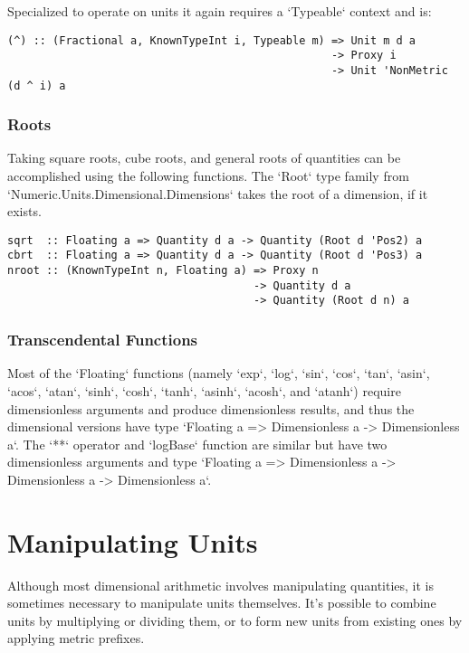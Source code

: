 \documentclass[11pt]{report}
\begin{document}
Specialized to operate on units it again requires a `Typeable` context and is:

\begin{lstlisting}
(^) :: (Fractional a, KnownTypeInt i, Typeable m) => Unit m d a
                                                  -> Proxy i
                                                  -> Unit 'NonMetric (d ^ i) a
\end{lstlisting}

\subsection{Roots}

Taking square roots, cube roots, and general roots of quantities can be accomplished using the following functions.
The `Root` type family from `Numeric.Units.Dimensional.Dimensions` takes the root of a dimension, if it exists.

\begin{lstlisting}
sqrt  :: Floating a => Quantity d a -> Quantity (Root d 'Pos2) a
cbrt  :: Floating a => Quantity d a -> Quantity (Root d 'Pos3) a
nroot :: (KnownTypeInt n, Floating a) => Proxy n
                                      -> Quantity d a
                                      -> Quantity (Root d n) a
\end{lstlisting}

\subsection{Transcendental Functions}

Most of the `Floating` functions (namely `exp`, `log`, `sin`, `cos`, `tan`, `asin`, `acos`, `atan`, `sinh`, `cosh`, `tanh`, `asinh`, `acosh`, and `atanh`)
require dimensionless arguments and produce dimensionless results, and thus the dimensional versions have type `Floating a => Dimensionless a -> Dimensionless a`.
The `**` operator and `logBase` function are similar but have two dimensionless arguments and type `Floating a => Dimensionless a -> Dimensionless a -> Dimensionless a`.






\chapter{Manipulating Units}

Although most dimensional arithmetic involves manipulating quantities, it is sometimes necessary
to manipulate units themselves. It's possible to combine units by multiplying or dividing them, or to
form new units from existing ones by applying metric prefixes.
\end{document}
